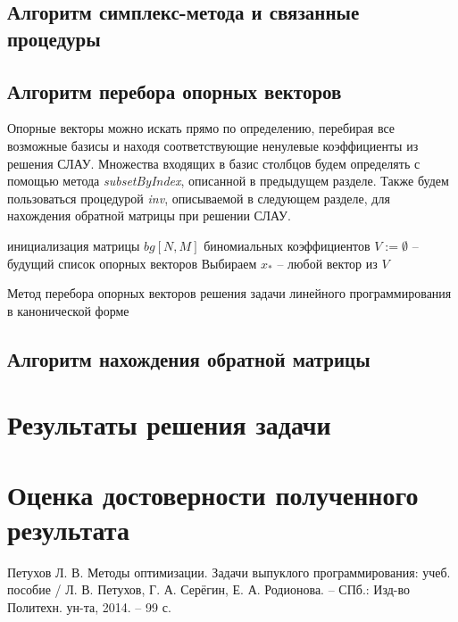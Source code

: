 \documentclass[main.tex]{subfiles}
\begin{document}
\subsection{Алгоритм симплекс-метода и связанные процедуры}

\subsection{Алгоритм перебора опорных векторов}
Опорные векторы можно искать прямо по определению, перебирая все возможные базисы и находя соответствующие ненулевые коэффициенты из решения СЛАУ. Множества входящих в базис столбцов будем определять с помощью метода \textit{subsetByIndex}, описанной в предыдущем разделе. Также будем пользоваться процедурой \textit{inv}, описываемой в следующем разделе, для нахождения обратной матрицы при решении СЛАУ.\\

\begin{algorithm}[H]
	инициализация матрицы $bg[N,M]$ биномиальных коэффициентов\;
	$V:=\emptyset$ -- будущий список опорных векторов\;
	Выбираем $x_*$  -- любой вектор из $V$\;
	
	\caption{Метод перебора опорных векторов решения задачи линейного программирования в канонической форме}
\end{algorithm}

\subsection {Алгоритм нахождения обратной матрицы}
\section{Результаты решения задачи}
\section{Оценка достоверности полученного результата}
\begin{thebibliography}{99}
	 Петухов Л. В. Методы оптимизации. Задачи выпуклого программирования: учеб. пособие / Л. В. Петухов, Г. А. Серёгин, Е. А. Родионова. -- СПб.: Изд-во Политехн. ун-та, 2014. -- 99 с.
\end{thebibliography}
\end{document}
